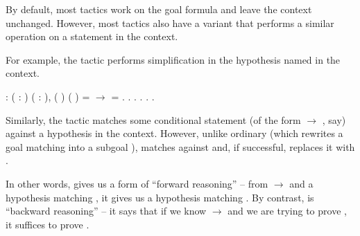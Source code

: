 \documentclass[12pt]{report}
\begin{document}
 By default, most tactics work on the goal formula and leave
    the context unchanged.  However, most tactics also have a variant
    that performs a similar operation on a statement in the context.


    For example, the tactic    performs simplification in
    the hypothesis named  in the context. \begin{coqdoccode}
\coqdocemptyline
\coqdocnoindent
{}  : \coqdockw{\ensuremath{\forall}} (  : ) ( : ),\coqdoceol
\coqdocindent{2.50em}
 ( ) ( ) =   \ensuremath{\rightarrow}\coqdoceol
\coqdocindent{2.50em}
   = .\coqdoceol
\coqdocnoindent
{}.\coqdoceol
\coqdocindent{1.00em}
    .   .  . .\coqdoceol
\coqdocemptyline
\end{coqdoccode}
Similarly, the tactic     matches some
    conditional statement  (of the form  \ensuremath{\rightarrow} , say) against a
    hypothesis  in the context.  However, unlike ordinary
     (which rewrites a goal matching  into a subgoal ),
        matches  against  and, if successful,
    replaces it with .


    In other words,     gives us a form of ``forward
    reasoning'' -- from  \ensuremath{\rightarrow}  and a hypothesis matching , it
    gives us a hypothesis matching .  By contrast,   is
    ``backward reasoning'' -- it says that if we know \ensuremath{\rightarrow} and we
    are trying to prove , it suffices to prove .  
\end{document}
